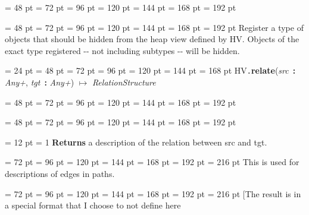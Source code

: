 {{{{\par \noindent  \leftskip = 48 pt  \leftmargini = 72 pt  \leftmarginii = 96 pt  \leftmarginiii = 120 pt  \leftmarginiv = 144 pt  \leftmarginv = 168 pt  \leftmarginvi = 192 pt {\par \noindent
\par}
\par}
{\par \noindent  \leftskip = 48 pt  \leftmargini = 72 pt  \leftmarginii = 96 pt  \leftmarginiii = 120 pt  \leftmarginiv = 144 pt  \leftmarginv = 168 pt  \leftmarginvi = 192 pt 
Register a type of objects that should be hidden from the heap view
defined by HV. Objects of the exact type registered -{}- not including
subtypes -{}- will be hidden.
\par}
\par}
\par}
{\par \noindent  \leftskip = 24 pt  \leftmargini = 48 pt  \leftmarginii = 72 pt  \leftmarginiii = 96 pt  \leftmarginiv = 120 pt  \leftmarginv = 144 pt  \leftmarginvi = 168 pt HV{\tt .\/}{\bf {\large {\bf relate\/}}\/}({\em src\/}~{\bf :}  {\em Any+\/}, {\em tgt\/}~{\bf :}  {\em Any+\/}) \(\mapsto \)  {\em RelationStructure\/}{\par \noindent
{\par \noindent  \leftskip = 48 pt  \leftmargini = 72 pt  \leftmarginii = 96 pt  \leftmarginiii = 120 pt  \leftmarginiv = 144 pt  \leftmarginv = 168 pt  \leftmarginvi = 192 pt {\par \noindent
\par}
\par}
{\par \noindent  \leftskip = 48 pt  \leftmargini = 72 pt  \leftmarginii = 96 pt  \leftmarginiii = 120 pt  \leftmarginiv = 144 pt  \leftmarginv = 168 pt  \leftmarginvi = 192 pt {\par \noindent
{\par \pagebreak[3.100000] \noindent \hangindent = 12 pt \hangafter = 1 
{\bf Returns \/} a description of the relation between src and tgt.\par}
{\par \noindent  \leftskip = 72 pt  \leftmargini = 96 pt  \leftmarginii = 120 pt  \leftmarginiii = 144 pt  \leftmarginiv = 168 pt  \leftmarginv = 192 pt  \leftmarginvi = 216 pt  This is used for descriptions of edges in paths.\par}
{\par \noindent  \leftskip = 72 pt  \leftmargini = 96 pt  \leftmarginii = 120 pt  \leftmarginiii = 144 pt  \leftmarginiv = 168 pt  \leftmarginv = 192 pt  \leftmarginvi = 216 pt  {[}The result is in a special format that I choose to not define here
}}}}}}
